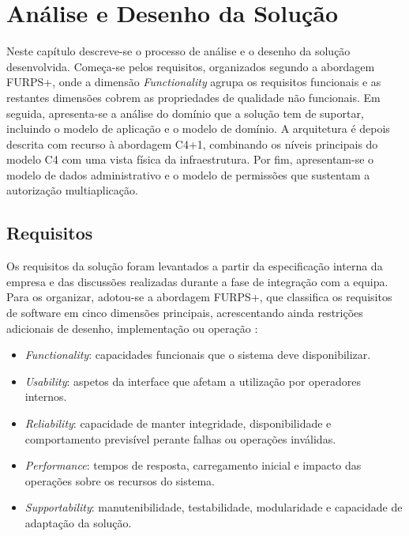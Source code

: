 \chapter{Análise e Desenho da Solução}
\label{cap:analise_desenho}

Neste capítulo descreve-se o processo de análise e o desenho da solução desenvolvida. Começa-se pelos requisitos, organizados segundo a abordagem \gls{FURPS+}, onde a dimensão \textit{Functionality} agrupa os requisitos funcionais e as restantes dimensões cobrem as propriedades de qualidade não funcionais. Em seguida, apresenta-se a análise do domínio que a solução tem de suportar, incluindo o modelo de aplicação e o modelo de domínio. A arquitetura é depois descrita com recurso à abordagem C4+1, combinando os níveis principais do modelo C4 \cite{C4Model} com uma vista física da infraestrutura. Por fim, apresentam-se o modelo de dados administrativo e o modelo de permissões que sustentam a autorização multiaplicação.


\section{Requisitos}
\label{sec:requisitos}

Os requisitos da solução foram levantados a partir da especificação interna da empresa \cite{BackofficeSpec} e das discussões realizadas durante a fase de integração com a equipa. Para os organizar, adotou-se a abordagem \gls{FURPS+}, que classifica os requisitos de software em cinco dimensões principais, acrescentando ainda restrições adicionais de desenho, implementação ou operação \cite{Rashid2024FURPSMoSCoW}:

\begin{itemize}
  \item \textit{Functionality}: capacidades funcionais que o sistema deve disponibilizar.
  \item \textit{Usability}: aspetos da interface que afetam a utilização por operadores internos.
  \item \textit{Reliability}: capacidade de manter integridade, disponibilidade e comportamento previsível perante falhas ou operações inválidas.
  \item \textit{Performance}: tempos de resposta, carregamento inicial e impacto das operações sobre os recursos do sistema.
  \item \textit{Supportability}: manutenibilidade, testabilidade, modularidade e capacidade de adaptação da solução.
\end{itemize}

